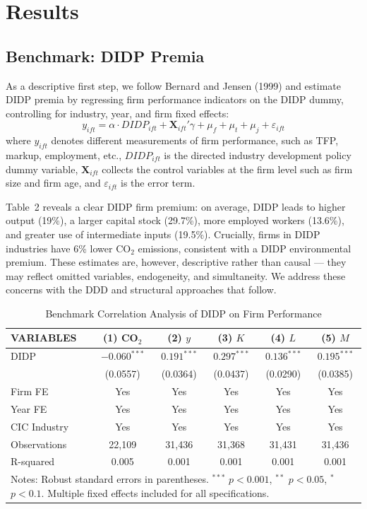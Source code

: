 \documentclass[11pt,a4paper]{article}
\begin{document}
\section{Results}

\subsection{Benchmark: DIDP Premia}

As a descriptive first step, we follow Bernard and Jensen (1999) and estimate DIDP premia by regressing firm performance indicators on the DIDP dummy, controlling for industry, year, and firm fixed effects:
\begin{equation}
y_{ift} = \alpha\cdot DIDP_{ift} + \mathbf{X}_{ift}'\gamma + \mu_f + \mu_t + \mu_j + \varepsilon_{ift}
\end{equation}
where $y_{ift}$ denotes different measurements of firm performance, such as TFP, markup, employment, etc., $DIDP_{ift}$ is the directed industry development policy dummy variable, $\mathbf{X}_{ift}$ collects the control variables at the firm level such as firm size and firm age, and $\varepsilon_{ift}$ is the error term.


Table~2 reveals a clear DIDP firm premium: on average, DIDP leads to higher output (19\%), a larger capital stock (29.7\%), more employed workers (13.6\%), and greater use of intermediate inputs (19.5\%). Crucially, firms in DIDP industries have 6\% lower CO$_2$ emissions, consistent with a DIDP environmental premium. These estimates are, however, descriptive rather than causal --- they may reflect omitted variables, endogeneity, and simultaneity. We address these concerns with the DDD and structural approaches that follow.

\begin{table}[htbp]
\centering
\caption{Benchmark Correlation Analysis of DIDP on Firm Performance}
\label{tab:benchmark}
\begin{tabular}{lccccc}
\toprule
VARIABLES & (1) CO$_2$ & (2) $y$ & (3) $K$ & (4) $L$ & (5) $M$ \\
\midrule
DIDP & $-0.060^{***}$ & $0.191^{***}$ & $0.297^{***}$ & $0.136^{***}$ & $0.195^{***}$ \\
     & (0.0557)       & (0.0364)      & (0.0437)       & (0.0290)       & (0.0385) \\
Firm FE       & Yes & Yes & Yes & Yes & Yes \\
Year FE       & Yes & Yes & Yes & Yes & Yes \\
CIC Industry  & Yes & Yes & Yes & Yes & Yes \\
Observations  & 22{,}109 & 31{,}436 & 31{,}368 & 31{,}431 & 31{,}436 \\
R-squared     & 0.005 & 0.001 & 0.001 & 0.001 & 0.001 \\
\bottomrule
\multicolumn{6}{p{0.9\textwidth}}{\footnotesize Notes: Robust standard errors in parentheses. $^{***}$ $p<0.001$, $^{**}$ $p<0.05$, $^{*}$ $p<0.1$. Multiple fixed effects included for all specifications.}
\end{tabular}
\end{table}
\end{document}
